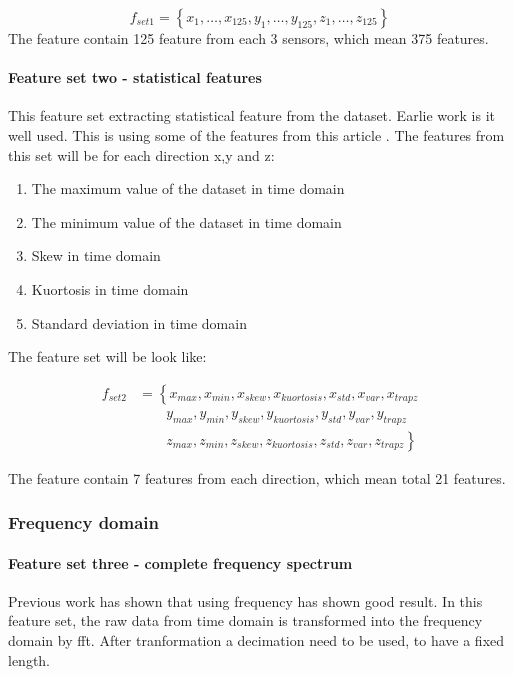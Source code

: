 \documentclass[USenglish]{ifimaster}  %
\begin{document}
\begin{equation} \label{eq:f1}
f_{set1}= \left\{ x_1,\dotsc,x_{125},y_1, \dotsc,y_{125},z_1,\dotsc,z_{125} \right\}
\end{equation}
The feature contain 125 feature from each 3 sensors, which mean 375 features.


\paragraph{Feature set two - statistical features} This feature set extracting statistical feature from the dataset. Earlie work is it well used. This is using some of the features from this article \cite{Hoffmann20141790}. The features from this set will be for each direction x,y and z:

\begin{enumerate}
\item The maximum value of the dataset in time domain
\item The minimum value of the dataset in time domain
\item Skew in time domain
\item Kuortosis in time domain 
\item Standard deviation in time domain
\end{enumerate}

The feature set will be look like:

\begin{align}
 f_{set2} &= \left\{ x_{max},x_{min},x_{skew},x_{kuortosis},x_{std},x_{var},x_{trapz} \right.\nonumber\\
 &\qquad \left. {} y_{max},y_{min},y_{skew},y_{kuortosis},y_{std},y_{var},y_{trapz} \right.\nonumber\\
 &\qquad \left. {} z_{max},z_{min},z_{skew},z_{kuortosis},z_{std},z_{var},z_{trapz} \right\}
\end{align}

The feature contain 7 features from each direction, which mean total 21 features. 

\subsubsection{Frequency domain}
\paragraph{Feature set three - complete frequency spectrum} Previous work has shown that using frequency has shown good result. In this feature set, the raw data from time domain is transformed into the frequency domain by fft. After tranformation a decimation need to be used, to have a fixed length. 
\end{document}
